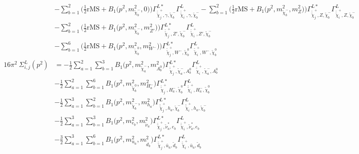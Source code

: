 \begin{itemize}
\begin{align}
 &- \sum_{b=1}^{2}\Big(\frac{1}{2} \text{rMS}  + {B_1\Big(p^{2},m^2_{\tilde{\chi}^-_{{b}}},0\Big)}\Big){\Gamma^{L*}_{\check{\tilde{\chi}}^+_{{j}},\gamma,\tilde{\chi}^-_{{b}}}} {\Gamma^L_{\check{\tilde{\chi}}^+_{{i}},\gamma,\tilde{\chi}^-_{{b}}}}  - \sum_{b=1}^{2}\Big(\frac{1}{2} \text{rMS}  + {B_1\Big(p^{2},m^2_{\tilde{\chi}^-_{{b}}},m^2_{Z}\Big)}\Big){\Gamma^{L*}_{\check{\tilde{\chi}}^+_{{j}},Z,\tilde{\chi}^-_{{b}}}} {\Gamma^L_{\check{\tilde{\chi}}^+_{{i}},Z,\tilde{\chi}^-_{{b}}}}  \nonumber \\ 
 &- \sum_{b=1}^{2}\Big(\frac{1}{2} \text{rMS}  + {B_1\Big(p^{2},m^2_{\tilde{\chi}^-_{{b}}},m^2_{{Z'}}\Big)}\Big){\Gamma^{L*}_{\check{\tilde{\chi}}^+_{{j}},{Z'},\tilde{\chi}^-_{{b}}}} {\Gamma^L_{\check{\tilde{\chi}}^+_{{i}},{Z'},\tilde{\chi}^-_{{b}}}}  \nonumber \\ 
 &- \sum_{b=1}^{6}\Big(\frac{1}{2} \text{rMS}  + {B_1\Big(p^{2},m^2_{\tilde{\chi}^0_{{b}}},m^2_{W^-}\Big)}\Big){\Gamma^{L*}_{\check{\tilde{\chi}}^+_{{j}},W^-,\tilde{\chi}^0_{{b}}}} {\Gamma^L_{\check{\tilde{\chi}}^+_{{i}},W^-,\tilde{\chi}^0_{{b}}}}  \\ 
16\pi^2 \ \Sigma^L_{i,j}(p^2) &= -\frac{1}{2} \sum_{a=1}^{2}\sum_{b=1}^{3}{B_1\Big(p^{2},m^2_{\tilde{\chi}^-_{{a}}},m^2_{A^0_{{b}}}\Big)} {\Gamma^{L*}_{\check{\tilde{\chi}}^+_{{j}},\tilde{\chi}^-_{{a}},A^0_{{b}}}} {\Gamma^L_{\check{\tilde{\chi}}^+_{{i}},\tilde{\chi}^-_{{a}},A^0_{{b}}}}  \nonumber \\ 
 &-\frac{1}{2} \sum_{a=1}^{2}\sum_{b=1}^{6}{B_1\Big(p^{2},m^2_{\tilde{\chi}^0_{{b}}},m^2_{H^-_{{a}}}\Big)} {\Gamma^{L*}_{\check{\tilde{\chi}}^+_{{j}},H^-_{{a}},\tilde{\chi}^0_{{b}}}} {\Gamma^L_{\check{\tilde{\chi}}^+_{{i}},H^-_{{a}},\tilde{\chi}^0_{{b}}}}  \nonumber \\ 
 &-\frac{1}{2} \sum_{a=1}^{3}\sum_{b=1}^{2}{B_1\Big(p^{2},m^2_{\tilde{\chi}^-_{{b}}},m^2_{h_{{a}}}\Big)} {\Gamma^{L*}_{\check{\tilde{\chi}}^+_{{j}},h_{{a}},\tilde{\chi}^-_{{b}}}} {\Gamma^L_{\check{\tilde{\chi}}^+_{{i}},h_{{a}},\tilde{\chi}^-_{{b}}}}  \nonumber \\ 
 &-\frac{1}{2} \sum_{a=1}^{3}\sum_{b=1}^{3}{B_1\Big(p^{2},m^2_{e_{{b}}},m^2_{\tilde{\nu}_{{a}}}\Big)} {\Gamma^{L*}_{\check{\tilde{\chi}}^+_{{j}},\tilde{\nu}^*_{{a}},e_{{b}}}} {\Gamma^L_{\check{\tilde{\chi}}^+_{{i}},\tilde{\nu}^*_{{a}},e_{{b}}}}  \nonumber \\ 
 &-\frac{3}{2} \sum_{a=1}^{3}\sum_{b=1}^{6}{B_1\Big(p^{2},m^2_{u_{{a}}},m^2_{\tilde{d}_{{b}}}\Big)} {\Gamma^{L*}_{\check{\tilde{\chi}}^+_{{j}},\bar{u}_{{a}},\tilde{d}_{{b}}}} {\Gamma^L_{\check{\tilde{\chi}}^+_{{i}},\bar{u}_{{a}},\tilde{d}_{{b}}}}  \nonumber \\ 

\end{align}
\end{itemize}
